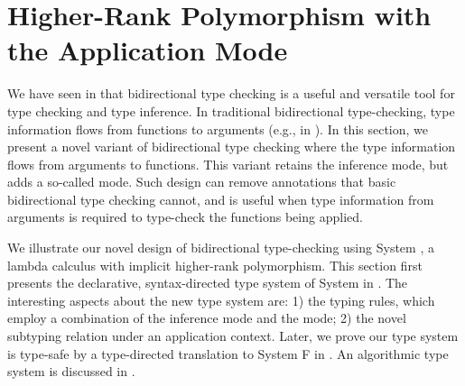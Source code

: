 \chapter{Higher-Rank Polymorphism with the Application Mode}
\label{chap:BiDirectional}

We have seen in  that bidirectional type checking is a useful and
versatile tool for type checking and type inference. In traditional
bidirectional type-checking, type information flows from functions to arguments
(e.g.,  in ). In this section, we
present a novel variant of bidirectional type checking where the type
information flows from arguments to functions. This variant retains the
inference mode, but adds a so-called \textit{\mode} mode. Such design can remove
annotations that basic bidirectional type checking cannot, and is useful when
type information from arguments is required to type-check the functions being
applied.

We illustrate our novel design of bidirectional type-checking using System \ap,
a lambda calculus with implicit higher-rank polymorphism. This section first
presents the declarative, syntax-directed type system of System \ap
in . The interesting aspects about the new type system
are: 1) the typing rules, which employ a combination of the inference mode and
the \textit{\mode} mode; 2) the novel subtyping relation under an application
context. Later, we prove our type system is type-safe by a type-directed
translation to System F in . An algorithmic type system
is discussed in .












